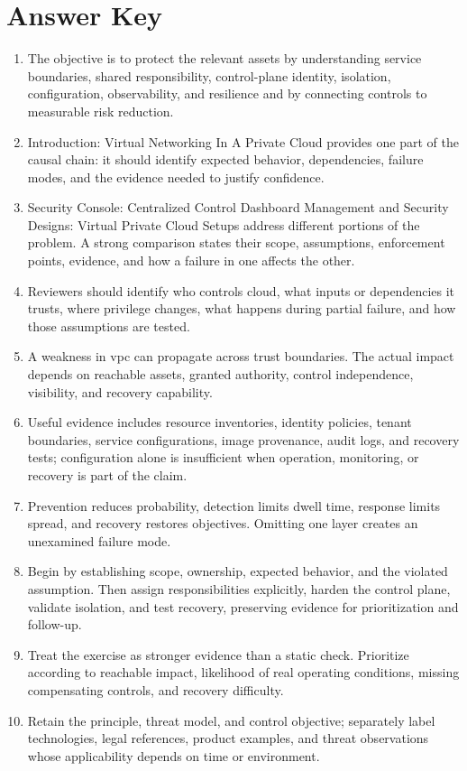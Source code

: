 \documentclass[11pt,letterpaper]{article}
\begin{document}
\section*{Answer Key}
\begin{enumerate}
\item The objective is to protect the relevant assets by understanding service boundaries, shared responsibility, control-plane identity, isolation, configuration, observability, and resilience and by connecting controls to measurable risk reduction.
\item Introduction: Virtual Networking In A Private Cloud provides one part of the causal chain: it should identify expected behavior, dependencies, failure modes, and the evidence needed to justify confidence.
\item Security Console: Centralized Control Dashboard Management and Security Designs: Virtual Private Cloud Setups address different portions of the problem. A strong comparison states their scope, assumptions, enforcement points, evidence, and how a failure in one affects the other.
\item Reviewers should identify who controls cloud, what inputs or dependencies it trusts, where privilege changes, what happens during partial failure, and how those assumptions are tested.
\item A weakness in vpc can propagate across trust boundaries. The actual impact depends on reachable assets, granted authority, control independence, visibility, and recovery capability.
\item Useful evidence includes resource inventories, identity policies, tenant boundaries, service configurations, image provenance, audit logs, and recovery tests; configuration alone is insufficient when operation, monitoring, or recovery is part of the claim.
\item Prevention reduces probability, detection limits dwell time, response limits spread, and recovery restores objectives. Omitting one layer creates an unexamined failure mode.
\item Begin by establishing scope, ownership, expected behavior, and the violated assumption. Then assign responsibilities explicitly, harden the control plane, validate isolation, and test recovery, preserving evidence for prioritization and follow-up.
\item Treat the exercise as stronger evidence than a static check. Prioritize according to reachable impact, likelihood of real operating conditions, missing compensating controls, and recovery difficulty.
\item Retain the principle, threat model, and control objective; separately label technologies, legal references, product examples, and threat observations whose applicability depends on time or environment.
\end{enumerate}
\end{document}
